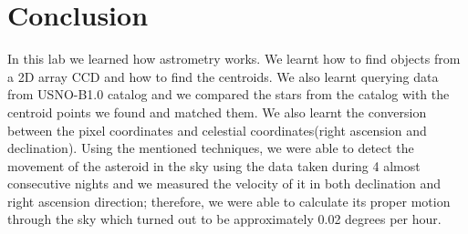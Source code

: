 \documentclass[letterpaper,12pt]{article}
\begin{document}
\section{Conclusion}
\label{sec:conclusion}
In this lab we learned how astrometry works. We learnt how to find objects from a 2D array CCD and how to find the centroids. We also learnt querying data from USNO-B1.0 catalog and we compared the stars from the catalog with the centroid points we found and matched them. We also learnt the conversion between the pixel coordinates and celestial coordinates(right ascension and declination). Using the mentioned techniques, we were able to detect the movement of the asteroid in the sky using the data taken during 4 almost consecutive nights and we measured the velocity of it in both declination and right ascension direction; therefore, we were able to calculate its proper motion through the sky which turned out to be approximately 0.02 degrees per hour.                                                                                                                                                                                                                                                                                                                                                                                                                                                                                                                                                                                                                                                                                                                                                                                                                                                                                                                                                                                                                                                                                                                                                                                                                                                                                                                                                                                                                                                                                                                                                                                                                                                                                                                                                                                                                                                                                                                                                                                                                                                                                                                                                                                                                                                                                                                                                                                                                    
\end{document}

